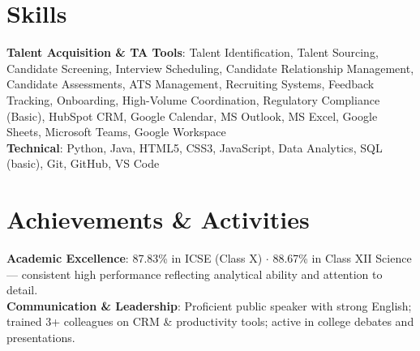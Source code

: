 \documentclass[letterpaper,10pt]{article}
\begin{document}
\section{Skills}
 \begin{itemize}[leftmargin=0.15in, label={}]
    \small{\item{
     \textbf{Talent Acquisition \& TA Tools}{: Talent Identification, Talent Sourcing, Candidate Screening, Interview Scheduling, Candidate Relationship Management, Candidate Assessments, ATS Management, Recruiting Systems, Feedback Tracking, Onboarding, High-Volume Coordination, Regulatory Compliance (Basic), HubSpot CRM, Google Calendar, MS Outlook, MS Excel, Google Sheets, Microsoft Teams, Google Workspace} \\
     \textbf{Technical}{: Python, Java, HTML5, CSS3, JavaScript, Data Analytics, SQL (basic), Git, GitHub, VS Code}
    }}
 \end{itemize}
\vspace{-15pt}

\section{Achievements \& Activities}
 \begin{itemize}[leftmargin=0.15in, label={}]
    \small{\item{
     \textbf{Academic Excellence}{: 87.83\% in ICSE (Class X) $\cdot$ 88.67\% in Class XII Science --- consistent high performance reflecting analytical ability and attention to detail.} \\
     \textbf{Communication \& Leadership}{: Proficient public speaker with strong English; trained 3+ colleagues on CRM \& productivity tools; active in college debates and presentations.}
    }}
 \end{itemize}
\end{document}
